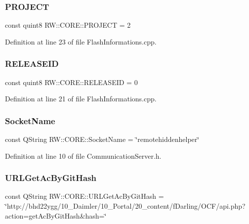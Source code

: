 \subsubsection{\texorpdfstring{P\+R\+O\+J\+E\+CT}{PROJECT}}
{\footnotesize\ttfamily const quint8 R\+W\+::\+C\+O\+R\+E\+::\+P\+R\+O\+J\+E\+CT = 2}



Definition at line 23 of file Flash\+Informations.\+cpp.

\hypertarget{namespace_r_w_1_1_c_o_r_e_a2fe4b6c0a4a833ba0dfc0ea6429250be}{}\label{namespace_r_w_1_1_c_o_r_e_a2fe4b6c0a4a833ba0dfc0ea6429250be} 
\subsubsection{\texorpdfstring{R\+E\+L\+E\+A\+S\+E\+ID}{RELEASEID}}
{\footnotesize\ttfamily const quint8 R\+W\+::\+C\+O\+R\+E\+::\+R\+E\+L\+E\+A\+S\+E\+ID = 0}



Definition at line 21 of file Flash\+Informations.\+cpp.

\hypertarget{namespace_r_w_1_1_c_o_r_e_adaaf185681c4c91a7d72836e233b6088}{}\label{namespace_r_w_1_1_c_o_r_e_adaaf185681c4c91a7d72836e233b6088} 
\subsubsection{\texorpdfstring{Socket\+Name}{SocketName}}
{\footnotesize\ttfamily const Q\+String R\+W\+::\+C\+O\+R\+E\+::\+Socket\+Name = \char`\"{}remotehiddenhelper\char`\"{}}



Definition at line 10 of file Communication\+Server.\+h.

\hypertarget{namespace_r_w_1_1_c_o_r_e_affb7fb47b505558e4dfa32d94e2d4e91}{}\label{namespace_r_w_1_1_c_o_r_e_affb7fb47b505558e4dfa32d94e2d4e91} 
\subsubsection{\texorpdfstring{U\+R\+L\+Get\+Ac\+By\+Git\+Hash}{URLGetAcByGitHash}}
{\footnotesize\ttfamily const Q\+String R\+W\+::\+C\+O\+R\+E\+::\+U\+R\+L\+Get\+Ac\+By\+Git\+Hash = \char`\"{}http\+://bhd22ygg/10\+\_\+\+Daimler/10\+\_\+\+Portal/20\+\_\+content/f\+Darling/\+O\+C\+F/api.\+php?action=get\+Ac\+By\+Git\+Hash\&hash=\char`\"{}}



